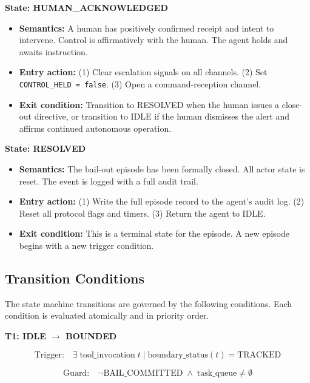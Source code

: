 \bigskip

\noindent\textbf{State: HUMAN\_ACKNOWLEDGED}

\begin{itemize}
  \item \textbf{Semantics:} A human has positively confirmed receipt and intent to intervene. Control is affirmatively with the human. The agent holds and awaits instruction.
  \item \textbf{Entry action:} (1) Clear escalation signals on all channels. (2) Set \texttt{CONTROL\_HELD = false}. (3) Open a command-reception channel.
  \item \textbf{Exit condition:} Transition to RESOLVED when the human issues a close-out directive, or transition to IDLE if the human dismisses the alert and affirms continued autonomous operation.
\end{itemize}

\bigskip

\noindent\textbf{State: RESOLVED}

\begin{itemize}
  \item \textbf{Semantics:} The bail-out episode has been formally closed. All actor state is reset. The event is logged with a full audit trail.
  \item \textbf{Entry action:} (1) Write the full episode record to the agent's audit log. (2) Reset all protocol flags and timers. (3) Return the agent to IDLE.
  \item \textbf{Exit condition:} This is a terminal state for the episode. A new episode begins with a new trigger condition.
\end{itemize}

\bigskip

\subsection{Transition Conditions}

The state machine transitions are governed by the following conditions. Each condition is evaluated atomically and in priority order.

\bigskip

\noindent\textbf{T1: IDLE $\rightarrow$ BOUNDED}

\[
\text{Trigger:} \quad \exists \; \text{tool\_invocation} \; t \;|\; \text{boundary\_status}(t) = \text{TRACKED}
\]

\[
\text{Guard:} \quad \neg \text{BAIL\_COMMITTED} \;\land\; \text{task\_queue} \neq \emptyset
\]


